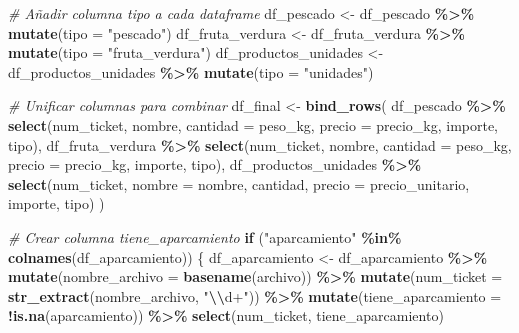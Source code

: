 \documentclass[,,,oneauthor,pdftex]{Definitions/mdpi}
\newenvironment{Shaded}{\begin{snugshade}}{\end{snugshade}}
\newcommand{\AttributeTok}[1]{\textcolor[rgb]{0.13,0.29,0.53}{#1}}
\newcommand{\CommentTok}[1]{\textcolor[rgb]{0.56,0.35,0.01}{\textit{#1}}}
\newcommand{\ControlFlowTok}[1]{\textcolor[rgb]{0.13,0.29,0.53}{\textbf{#1}}}
\newcommand{\FunctionTok}[1]{\textcolor[rgb]{0.13,0.29,0.53}{\textbf{#1}}}
\newcommand{\NormalTok}[1]{#1}
\newcommand{\OtherTok}[1]{\textcolor[rgb]{0.56,0.35,0.01}{#1}}
\newcommand{\SpecialCharTok}[1]{\textcolor[rgb]{0.81,0.36,0.00}{\textbf{#1}}}
\newcommand{\StringTok}[1]{\textcolor[rgb]{0.31,0.60,0.02}{#1}}
\begin{document}
\begin{Shaded}
\begin{Highlighting}[]
\CommentTok{\# Añadir columna \textquotesingle{}tipo\textquotesingle{} a cada dataframe}
\NormalTok{df\_pescado }\OtherTok{\textless{}{-}}\NormalTok{ df\_pescado }\SpecialCharTok{\%\textgreater{}\%} \FunctionTok{mutate}\NormalTok{(}\AttributeTok{tipo =} \StringTok{"pescado"}\NormalTok{)}
\NormalTok{df\_fruta\_verdura }\OtherTok{\textless{}{-}}\NormalTok{ df\_fruta\_verdura }\SpecialCharTok{\%\textgreater{}\%} \FunctionTok{mutate}\NormalTok{(}\AttributeTok{tipo =} \StringTok{"fruta\_verdura"}\NormalTok{)}
\NormalTok{df\_productos\_unidades }\OtherTok{\textless{}{-}}\NormalTok{ df\_productos\_unidades }\SpecialCharTok{\%\textgreater{}\%} \FunctionTok{mutate}\NormalTok{(}\AttributeTok{tipo =} \StringTok{"unidades"}\NormalTok{)}

\CommentTok{\# Unificar columnas para combinar}
\NormalTok{df\_final }\OtherTok{\textless{}{-}} \FunctionTok{bind\_rows}\NormalTok{(}
\NormalTok{  df\_pescado }\SpecialCharTok{\%\textgreater{}\%} \FunctionTok{select}\NormalTok{(num\_ticket, nombre, }\AttributeTok{cantidad =}\NormalTok{ peso\_kg, }\AttributeTok{precio =}\NormalTok{ precio\_kg, importe, tipo),}
\NormalTok{  df\_fruta\_verdura }\SpecialCharTok{\%\textgreater{}\%} \FunctionTok{select}\NormalTok{(num\_ticket, nombre, }\AttributeTok{cantidad =}\NormalTok{ peso\_kg, }\AttributeTok{precio =}\NormalTok{ precio\_kg, importe, tipo),}
\NormalTok{  df\_productos\_unidades }\SpecialCharTok{\%\textgreater{}\%} \FunctionTok{select}\NormalTok{(num\_ticket, }\AttributeTok{nombre =}\NormalTok{ nombre, cantidad, }\AttributeTok{precio =}\NormalTok{ precio\_unitario, importe, tipo)}
\NormalTok{)}

\CommentTok{\# Crear columna tiene\_aparcamiento }
\ControlFlowTok{if}\NormalTok{ (}\StringTok{"aparcamiento"} \SpecialCharTok{\%in\%} \FunctionTok{colnames}\NormalTok{(df\_aparcamiento)) \{}
\NormalTok{  df\_aparcamiento }\OtherTok{\textless{}{-}}\NormalTok{ df\_aparcamiento }\SpecialCharTok{\%\textgreater{}\%}
    \FunctionTok{mutate}\NormalTok{(}\AttributeTok{nombre\_archivo =} \FunctionTok{basename}\NormalTok{(archivo)) }\SpecialCharTok{\%\textgreater{}\%}
    \FunctionTok{mutate}\NormalTok{(}\AttributeTok{num\_ticket =} \FunctionTok{str\_extract}\NormalTok{(nombre\_archivo, }\StringTok{"}\SpecialCharTok{\textbackslash{}\textbackslash{}}\StringTok{d+"}\NormalTok{)) }\SpecialCharTok{\%\textgreater{}\%}
    \FunctionTok{mutate}\NormalTok{(}\AttributeTok{tiene\_aparcamiento =} \SpecialCharTok{!}\FunctionTok{is.na}\NormalTok{(aparcamiento)) }\SpecialCharTok{\%\textgreater{}\%}
    \FunctionTok{select}\NormalTok{(num\_ticket, tiene\_aparcamiento)}


\end{Highlighting}
\end{Shaded}
\end{document}
